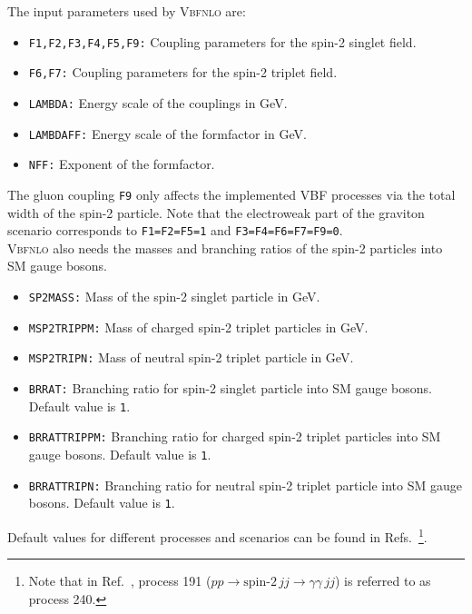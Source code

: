 \documentclass[english,12pt]{article}
\begin{document}
The input parameters used by \textsc{Vbfnlo} are:
\begin{itemize}
 \item {\tt F1,F2,F3,F4,F5,F9:} Coupling parameters for the spin-2 singlet field. 
 \item {\tt F6,F7:} Coupling parameters for the spin-2 triplet field. 
 \item {\tt LAMBDA:} Energy scale of the couplings in GeV. 
 \item {\tt LAMBDAFF:} Energy scale of the formfactor in GeV. 
 \item {\tt NFF:} Exponent of the formfactor. 
\end{itemize}
The gluon coupling {\tt F9} only affects the implemented VBF processes via the total 
width of the spin-2 particle. 
Note that the electroweak part of the graviton scenario corresponds 
to {\tt F1=F2=F5=1} and {\tt F3=F4=F6=F7=F9=0}. \\

\textsc{Vbfnlo} also needs the masses and branching ratios of the spin-2
particles into SM gauge bosons. 
\begin{itemize}
 \item {\tt SP2MASS:} Mass of the spin-2 singlet particle in GeV.  
 \item {\tt MSP2TRIPPM:} Mass of charged spin-2 triplet particles in GeV. 
 \item {\tt MSP2TRIPN:} Mass of neutral spin-2 triplet particle in GeV. 
 \item {\tt BRRAT:} Branching ratio for spin-2 singlet particle into SM gauge bosons. 
 Default value is {\tt 1}.
 \item {\tt BRRATTRIPPM:} Branching ratio for charged spin-2 triplet particles into SM gauge bosons.  
Default value is {\tt 1}.
 \item {\tt BRRATTRIPN:} Branching ratio for neutral spin-2 triplet particle into SM gauge bosons.  Default 
value is {\tt 1}.
\end{itemize}

Default values for different processes and scenarios can be found in 
Refs.~\cite{frank,Frank:2012wh,Frank:2013gca}\footnote{Note that in Ref.~\cite{frank}, 
process 191 ($pp \rightarrow \mbox{spin-2} \, jj \rightarrow \gamma \gamma \, jj$) is referred to as process 240.}. 
\end{document}
